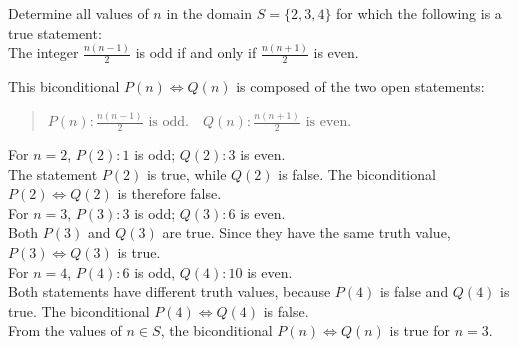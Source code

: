 \documentclass[12pt]{article}
\newenvironment{problem}[2][Problem]{\begin{trivlist}
		\item[\hskip \labelsep {\bfseries #1}\hskip \labelsep {\bfseries #2.}]}{\end{trivlist}}
\newenvironment{solution}[2][Solution]{\begin{trivlist}
		\item[\hskip \labelsep {\bfseries #1}\hskip \labelsep {\bfseries #2.}]}{\end{trivlist}}
\begin{document}
\begin{problem}{42}
	Determine all values of $n$ in the domain $S = \{2,3,4\}$ for which the following is a true statement:\\
	 The integer $\frac{n(n-1)}{2}$ is odd if and only if $\frac{n(n+1)}{2}$ is even.
	 \begin{solution}{}
	 This biconditional $P(n) \Leftrightarrow Q(n)$ is composed of the two open statements:
	 \begin{quote}
	 	\centering
	 	$P(n):\frac{n(n-1)}{2} \text{ is odd.} \quad Q(n):\frac{n(n+1)}{2} \text{ is even.}$
	 \end{quote}
 	
 	\noindent For $n = 2$, $P(2): 1$ is odd; $Q(2): 3$ is even.\\
 	The statement $P(2)$ is true, while $Q(2)$ is false. The biconditional $P(2) \Leftrightarrow Q(2)$ is therefore false.\\
 	
 	\noindent For $n = 3$, $P(3):3$ is odd; $Q(3):6$ is even.\\
 	Both $P(3)$ and $Q(3)$ are true. Since they have the same truth value, $P(3) \Leftrightarrow Q(3)$ is true.\\
 	
 	\noindent For $n = 4$, $P(4):6$ is odd, $Q(4):10$ is even.\\
 	Both statements have different truth values, because $P(4)$ is false and $Q(4)$ is true. The biconditional $P(4) \Leftrightarrow Q(4)$ is false.\\
 	From the values of $n \in S$, the biconditional $P(n) \Leftrightarrow Q(n)$ is true for $n = 3$.
 	\end{solution}
\end{problem}
\end{document}
